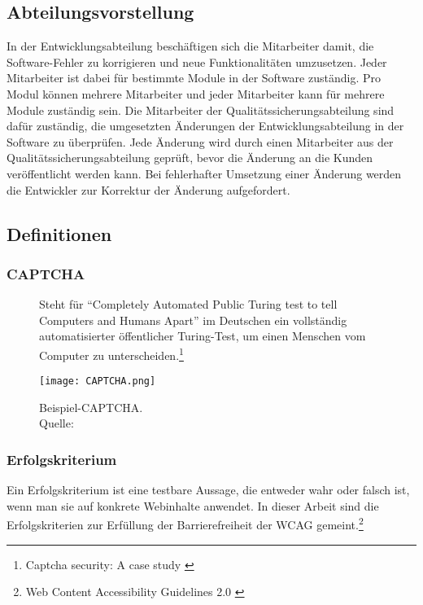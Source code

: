 \subsection{Abteilungsvorstellung}
In der Entwicklungsabteilung beschäftigen sich die Mitarbeiter damit, die Software-Fehler zu korrigieren und neue Funktionalitäten umzusetzen. Jeder Mitarbeiter ist dabei für bestimmte Module in der Software zuständig. Pro Modul können mehrere Mitarbeiter und jeder Mitarbeiter kann für mehrere Module zuständig sein. Die Mitarbeiter der Qualitätssicherungsabteilung sind dafür zuständig, die umgesetzten Änderungen der Entwicklungsabteilung in der Software zu überprüfen. Jede Änderung wird durch einen Mitarbeiter aus der Qualitätssicherungsabteilung geprüft, bevor die Änderung an die Kunden veröffentlicht werden kann. Bei fehlerhafter Umsetzung einer Änderung werden die Entwickler zur Korrektur der Änderung aufgefordert.

\subsection{Definitionen}
\label{subsec: Definitionen}

\subsubsection{CAPTCHA}
\begin{figure}[h]
	\begin{minipage}{0.5\textwidth}
		Steht für "`Completely Automated Public Turing test to tell Computers and Humans Apart"' im Deutschen ein vollständig automatisierter öffentlicher
		Turing-Test, um einen Menschen vom Computer zu unterscheiden.\footnote{Captcha security: A case study \cite{yan2009captcha}}
	\end{minipage}
	\hfill
	\begin{minipage}{0.4\textwidth}
		\texttt{[image: CAPTCHA.png]}
		\caption[Beispiel-CAPTCHA]{Beispiel-CAPTCHA. \\Quelle: \cite{yan2009captcha}}
	\end{minipage}
\end{figure}

\subsubsection{Erfolgskriterium}
Ein Erfolgskriterium ist eine testbare Aussage, die entweder wahr oder falsch ist, wenn man sie auf konkrete Webinhalte anwendet. In dieser
Arbeit sind die Erfolgskriterien zur Erfüllung der Barrierefreiheit der \ac{WCAG} gemeint.\footnote{Web Content Accessibility Guidelines 2.0 \cite{WCAG2.0}}

